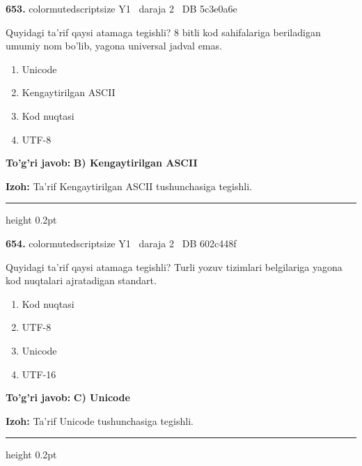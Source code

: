 \documentclass[10pt,a4paper,oneside]{article}
\begin{document}
\noindent\textbf{\color{ink}653.}  {color{muted}scriptsize Y1 \textbullet\ daraja 2 \textbullet\ DB 5c3e0a6e}
\par
Quyidagi ta'rif qaysi atamaga tegishli? 8 bitli kod sahifalariga beriladigan umumiy nom bo'lib, yagona universal jadval emas.
\begin{enumerate}[label=\Alph*),leftmargin=9mm]
\item Unicode
\item Kengaytirilgan ASCII
\item Kod nuqtasi
\item UTF-8
\end{enumerate}
\begin{tcolorbox}[enhanced,breakable,colback=teal!4,colframe=teal!50!black,boxrule=0.5pt,arc=1.1mm,left=3mm,right=3mm,top=1.7mm,bottom=1.7mm,before skip=2mm,after skip=2mm]
\textbf{\color{teal}To'g'ri javob:} \textbf{B) Kengaytirilgan ASCII}
\par\smallskip
\textbf{Izoh:} Ta'rif Kengaytirilgan ASCII tushunchasiga tegishli.
\end{tcolorbox}
\vspace{2mm}\hrule height 0.2pt \vspace{3mm}

\noindent\textbf{\color{ink}654.}  {color{muted}scriptsize Y1 \textbullet\ daraja 2 \textbullet\ DB 602c448f}
\par
Quyidagi ta'rif qaysi atamaga tegishli? Turli yozuv tizimlari belgilariga yagona kod nuqtalari ajratadigan standart.
\begin{enumerate}[label=\Alph*),leftmargin=9mm]
\item Kod nuqtasi
\item UTF-8
\item Unicode
\item UTF-16
\end{enumerate}
\begin{tcolorbox}[enhanced,breakable,colback=teal!4,colframe=teal!50!black,boxrule=0.5pt,arc=1.1mm,left=3mm,right=3mm,top=1.7mm,bottom=1.7mm,before skip=2mm,after skip=2mm]
\textbf{\color{teal}To'g'ri javob:} \textbf{C) Unicode}
\par\smallskip
\textbf{Izoh:} Ta'rif Unicode tushunchasiga tegishli.
\end{tcolorbox}
\vspace{2mm}\hrule height 0.2pt \vspace{3mm}
\end{document}
